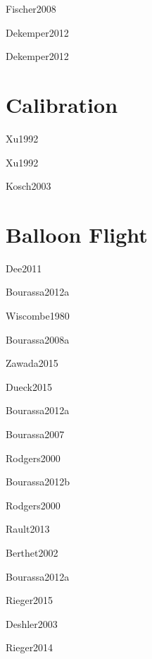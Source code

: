 \documentclass[12pt]{article}
\begin{document}
Fischer2008 \citep{Fischer2008}

Dekemper2012 \citep{Dekemper2012}

Dekemper2012 \citep{Dekemper2012}


\section{Calibration}

Xu1992 \citep{Xu1992}

Xu1992 \citep{Xu1992}

Kosch2003 \citep{Kosch2003}

\section{Balloon Flight}

Dee2011 \cite{Dee2011}

Bourassa2012a\citep{Bourassa2012a}

Wiscombe1980 \citep{Wiscombe1980}

Bourassa2008a \citep{Bourassa2008a}

Zawada2015 \citep{Zawada2015}

Dueck2015 \citep{Dueck2015}

Bourassa2012a\citep{Bourassa2012a}

Bourassa2007\citep{Bourassa2007}

Rodgers2000 \citep{Rodgers2000}

Bourassa2012b \citep{Bourassa2012b}

Rodgers2000 \citep{Rodgers2000}

Rault2013 \citep{Rault2013}

Berthet2002 \citep{Berthet2002}

Bourassa2012a \citep{Bourassa2012a}

Rieger2015 \citep{Rieger2015}

Deshler2003 \citep{Deshler2003}

Rieger2014 \citep{Rieger2014}





\end{document}
